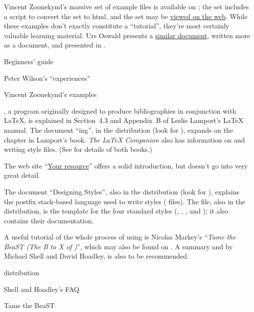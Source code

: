 Vincent Zoonekynd's massive set of example \MP{} files is available on
; the set includes a  script to convert the
set to html, and the set may be %
\href{http://zoonek.free.fr/LaTeX/Metapost/metapost.html}{viewed on the web}.
While these examples don't exactly constitute a ``tutorial'', they're
most certainly valuable learning material.  Urs Oswald presents a
\href{http://www.ursoswald.ch/metapost/tutorial.pdf}{similar document},
written more as a document, and presented in .
\begin{ctanrefs}
\item[\nothtml{\rmfamily}Beginners' guide]
\item[\nothtml{\rmfamily}Peter Wilson's ``experiences'']
\item[\nothtml{\rmfamily}Vincent Zoonekynd's examples]
\end{ctanrefs}


\BibTeX{}, a program originally designed to produce bibliographies in
conjunction with \LaTeX{}, is explained in Section~4.3 and Appendix~B
of Leslie Lamport's \LaTeX{} manual.
The document ``\BibTeX{}ing'', in the \BibTeX{} distribution (look for
),
expands on the chapter in Lamport's book.  \emph{The \LaTeX{} Companion}
also has information on \BibTeX{} and writing \BibTeX{} style files.
(See  for details of both
books.)

The web site ``\href{http://www.bibtex.org}{Your \BibTeX{} resource}''
offers a solid introduction, but doesn't go into very great detail.

The document ``Designing \BibTeX{} Styles'', also in the \BibTeX{}
distribution (look for
), explains the postfix stack-based language used to
write \BibTeX{} styles ( files). The file,
also in the \BibTeX{} distribution,
is the template for the four standard styles (,
, , and ); it also
contains their documentation.

A useful tutorial of the whole process of using \BibTeX{} is Nicolas
Markey's ``\emph{Tame the BeaST (The B to X of \BibTeX{})}'', which
may also be found on .  A summary and  by Michael
Shell and David Hoadley, is also to be recommended.
\begin{ctanrefs}
\item[\nothtml{\rmfamily}\BibTeX{} distribution]
\item[\nothtml{\rmfamily}Shell and Hoadley's FAQ]
\item[\nothtml{\rmfamily}Tame the BeaST]
\end{ctanrefs}

